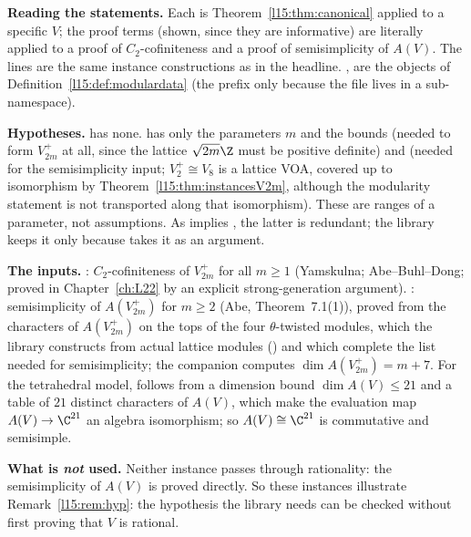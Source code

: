 \begin{dictionary}
\textbf{Reading the statements.} Each is Theorem~\ref{l15:thm:canonical} applied to a specific $V$; the proof terms (shown,
since they are informative) are literally \allowbreak{}\allowbreak{}
applied to a proof of $C_2$-cofiniteness and a proof of semisimplicity of $A(V)$. The  lines are the same
instance constructions as in the headline. ,  are the objects of
Definition~\ref{l15:def:modulardata} (the prefix  only because the file lives in a sub-namespace).

\textbf{Hypotheses.}  has none.  has only the parameters $m$ and
the bounds  (needed to form $V_{2m}^+$ at all, since the lattice $\sqrt{2m}\Z$ must be positive definite)
and  (needed for the semisimplicity input; $V_2^+\cong V_8$ is a lattice VOA, covered up to isomorphism by
Theorem~\ref{l15:thm:instancesV2m}, although the modularity statement is not transported along that isomorphism). These are
ranges of a parameter, not assumptions. As  implies , the latter is redundant; the library keeps it only
because  takes it as an argument.

\textbf{The inputs.} : $C_2$-cofiniteness of $V_{2m}^+$ for all $m\ge1$ (Yamskulna; Abe--Buhl--Dong;
proved in Chapter~\ref{ch:L22} by an explicit strong-generation argument). : semisimplicity of
$A(V_{2m}^+)$ for $m\ge2$ (Abe, Theorem~7.1(1)), proved from the characters of $A(V_{2m}^+)$ on the tops of the four
$\theta$-twisted modules, which the library constructs from actual lattice modules
() and which complete the list needed for semisimplicity; the companion  computes $\dim A(V_{2m}^+)=m+7$. For the
tetrahedral model,  follows from a dimension bound $\dim A(V)\le21$ and a table of $21$
distinct characters of $A(V)$, which make the evaluation map $A(V)\to\C^{21}$ an algebra isomorphism; so $A(V)\cong\C^{21}$
is commutative and semisimple.

\textbf{What is \emph{not} used.} Neither instance passes through rationality: the semisimplicity of $A(V)$ is proved directly.
So these instances illustrate Remark~\ref{l15:rem:hyp}: the hypothesis the library needs can be checked without first
proving that $V$ is rational.


\end{dictionary}
